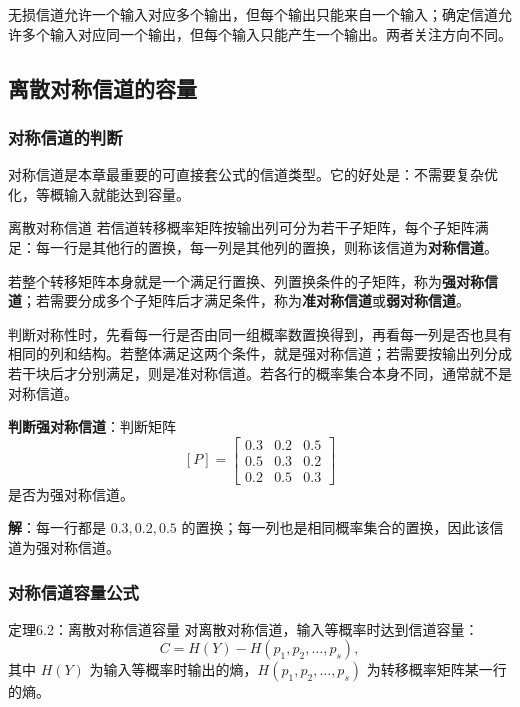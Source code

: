 无损信道允许一个输入对应多个输出，但每个输出只能来自一个输入；确定信道允许多个输入对应同一个输出，但每个输入只能产生一个输出。两者关注方向不同。

\subsection{离散对称信道的容量}

\subsubsection{对称信道的判断}
对称信道是本章最重要的可直接套公式的信道类型。它的好处是：不需要复杂优化，等概输入就能达到容量。

\begin{definitionBox}{离散对称信道}
若信道转移概率矩阵按输出列可分为若干子矩阵，每个子矩阵满足：每一行是其他行的置换，每一列是其他列的置换，则称该信道为\textbf{对称信道}。
\end{definitionBox}

若整个转移矩阵本身就是一个满足行置换、列置换条件的子矩阵，称为\textbf{强对称信道}；若需要分成多个子矩阵后才满足条件，称为\textbf{准对称信道}或\textbf{弱对称信道}。

判断对称性时，先看每一行是否由同一组概率数置换得到，再看每一列是否也具有相同的列和结构。若整体满足这两个条件，就是强对称信道；若需要按输出列分成若干块后才分别满足，则是准对称信道。若各行的概率集合本身不同，通常就不是对称信道。

\begin{example}
\label{ex:ch6-strongly-symmetric-check}
\textbf{判断强对称信道}：判断矩阵
\[
[P]=\begin{bmatrix}
0.3&0.2&0.5\\
0.5&0.3&0.2\\
0.2&0.5&0.3
\end{bmatrix}
\]
是否为强对称信道。

\textbf{解}：每一行都是 $0.3,0.2,0.5$ 的置换；每一列也是相同概率集合的置换，因此该信道为强对称信道。
\end{example}

\subsubsection{对称信道容量公式}

\begin{theoremBox}{定理6.2：离散对称信道容量}
对离散对称信道，输入等概率时达到信道容量：
\[
C=H(Y)-H(p_1,p_2,\dots,p_s),
\]
其中 $H(Y)$ 为输入等概率时输出的熵，$H(p_1,p_2,\dots,p_s)$ 为转移概率矩阵某一行的熵。
\end{theoremBox}

